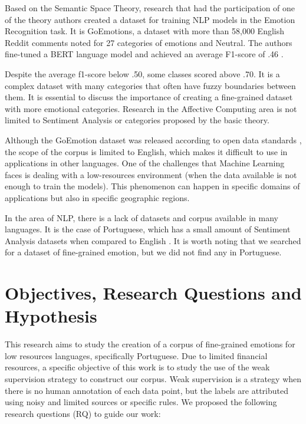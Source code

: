 \documentclass[12pt]{article}
\begin{document}
Based on the Semantic Space Theory, research that had the participation of one of the theory authors created a dataset for training NLP models in the Emotion Recognition task. It is GoEmotions, a dataset with more than 58,000 English Reddit comments noted for 27 categories of emotions and Neutral. The authors fine-tuned a BERT language model and achieved an average F1-score of .46 \cite{Demszky2020}.

Despite the average f1-score below .50, some classes scored above .70. It is a complex dataset with many categories that often have fuzzy boundaries between them. It is essential to discuss the importance of creating a fine-grained dataset with more emotional categories. Research in the Affective Computing area is not limited to Sentiment Analysis or categories proposed by the basic theory.

Although the GoEmotion dataset was released according to open data standards \cite{Demszky2020}, the scope of the corpus is limited to English, which makes it difficult to use in applications in other languages. One of the challenges that Machine Learning faces is dealing with a low-resources environment (when the data available is not enough to train the models). This phenomenon can happen in specific domains of applications but also in specific geographic regions.

In the area of NLP, there is a lack of datasets and corpus available in many languages. It is the case of Portuguese, which has a small amount of Sentiment Analysis datasets when compared to English \cite{Pereira2021}. It is worth noting that we searched for a dataset of fine-grained emotion, but we did not find any in Portuguese.

\section{Objectives, Research Questions and Hypothesis}
\label{sec:objectives}

This research aims to study the creation of a corpus of fine-grained emotions for low resources languages, specifically Portuguese. Due to limited financial resources, a specific objective of this work is to study the use of the weak supervision strategy to construct our corpus. Weak supervision is a strategy when there is no human annotation of each data point, but the labels are attributed using noisy and limited sources or specific rules. We proposed the following research questions (RQ) to guide our work:
\end{document}
